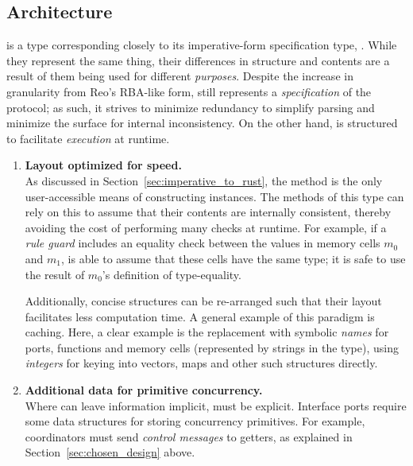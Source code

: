 \subsection{Architecture}
\label{sec:protocol_object_architecture}
 is a type corresponding closely to its imperative-form specification type, . While they represent the same thing, their differences in structure and contents are a result of them being used for different \textit{purposes}. Despite the increase in granularity from Reo's RBA-like form,  still represents a \textit{specification} of the protocol; as such, it strives to minimize redundancy to simplify parsing and minimize the surface for internal inconsistency. On the other hand,  is structured to facilitate \textit{execution} at runtime.

\begin{enumerate}
	\item \textbf{Layout optimized for speed.}\\
	As discussed in Section~\ref{sec:imperative_to_rust}, the  method is the only user-accessible means of constructing  instances. The methods of this type can rely on this to assume that their contents are internally consistent, thereby avoiding the cost of performing many checks at runtime. For example, if a \textit{rule guard} includes an equality check between the values in memory cells $m_0$ and $m_1$,  is able to assume that these cells have the same type; it is safe to use the result of $m_0$'s definition of type-equality.
	
	Additionally, concise structures can be re-arranged such that their layout facilitates less computation time. A general example of this paradigm is caching. Here, a clear example is the replacement with symbolic \textit{names} for ports, functions and memory cells (represented by strings in the  type), using \textit{integers} for keying into vectors, maps and other such structures directly.
	
	\item \textbf{Additional data for primitive concurrency.}\\
	Where  can leave information implicit,  must be explicit. Interface ports require some data structures for storing concurrency primitives. For example, coordinators must send \textit{control messages} to getters, as explained in Section~\ref{sec:chosen_design} above. 
\end{enumerate}

